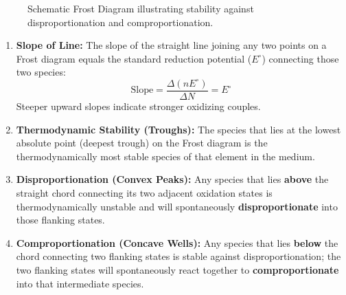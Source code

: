 \begin{figure}[htbp]
\centering
{}
\caption{Schematic Frost Diagram illustrating stability against disproportionation and comproportionation.}
\label{fig:frost_diagram}
\end{figure}

\begin{conceptbox}
\begin{enumerate}[leftmargin=*]
    \item \textbf{Slope of Line:} The slope of the straight line joining any two points on a Frost diagram equals the standard reduction potential ($E^\circ$) connecting those two species:
    \begin{equation}
        \text{Slope} = \frac{\Delta(nE^\circ)}{\Delta N} = E^\circ
    \end{equation}
    Steeper upward slopes indicate stronger oxidizing couples.
    \item \textbf{Thermodynamic Stability (Troughs):} The species that lies at the lowest absolute point (deepest trough) on the Frost diagram is the thermodynamically most stable species of that element in the medium.
    \item \textbf{Disproportionation (Convex Peaks):} Any species that lies \textbf{above} the straight chord connecting its two adjacent oxidation states is thermodynamically unstable and will spontaneously \textbf{disproportionate} into those flanking states.
    \item \textbf{Comproportionation (Concave Wells):} Any species that lies \textbf{below} the chord connecting two flanking states is stable against disproportionation; the two flanking states will spontaneously react together to \textbf{comproportionate} into that intermediate species.
\end{enumerate}
\end{conceptbox}


